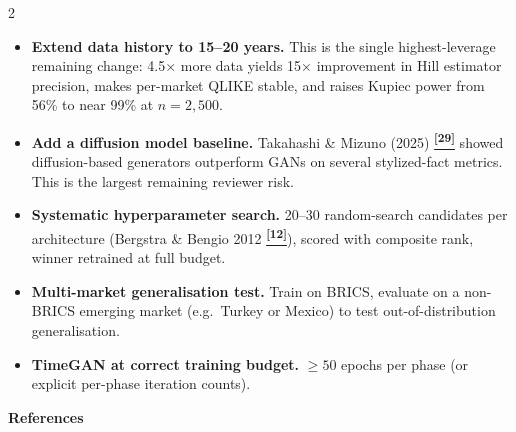 \documentclass[10pt]{article}
\newcommand{\amberbox}[2]{\begin{tcolorbox}[mybox={Amber}{ABg},title={#1}]#2\end{tcolorbox}}
\newcommand{\tcite}[1]{%
  \hyperlink{R:#1}{\textsuperscript{\scriptsize\textbf{[#1]}}}}
\begin{document}
\begin{multicols}{2}
\amberbox{Future Work}{%
\begin{itemize}
  \item \textbf{Extend data history to 15--20 years.} This is the single highest-leverage remaining change: 4.5$\times$ more data yields 15$\times$ improvement in Hill estimator precision, makes per-market QLIKE stable, and raises Kupiec power from 56\% to near 99\% at $n=2{,}500$.
  \item \textbf{Add a diffusion model baseline.} Takahashi \& Mizuno (2025)\tcite{29} showed diffusion-based generators outperform GANs on several stylized-fact metrics. This is the largest remaining reviewer risk.
  \item \textbf{Systematic hyperparameter search.} 20--30 random-search candidates per architecture (Bergstra \& Bengio 2012\tcite{12}), scored with composite rank, winner retrained at full budget.
  \item \textbf{Multi-market generalisation test.} Train on BRICS, evaluate on a non-BRICS emerging market (e.g.\ Turkey or Mexico) to test out-of-distribution generalisation.
  \item \textbf{TimeGAN at correct training budget.} $\geq 50$ epochs per phase (or explicit per-phase iteration counts).
\end{itemize}}

\end{multicols}

\clearpage

\begin{tcolorbox}[
  colback=NavyBg, colframe=NavyBg!60!black, arc=4pt,
  left=8pt, right=8pt, top=4pt, bottom=4pt,
  before skip=0pt, after skip=10pt]
{\large\bfseries\color{Navy} References}
\end{tcolorbox}
\end{document}
